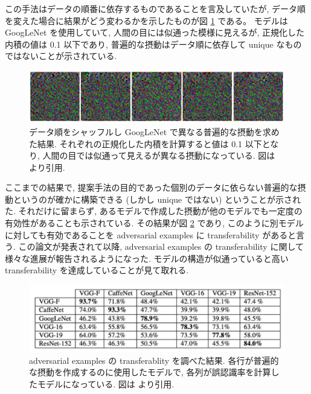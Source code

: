 この手法はデータの順番に依存するものであることを言及していたが, データ順を変えた場合に結果がどう変わるかを示したものが図 \ref{fig:universal-adversarial-perturbations-shuffle} である。
モデルは GoogLeNet を使用していて, 人間の目には似通った模様に見えるが, 正規化した内積の値は 0.1 以下であり, 普遍的な摂動はデータ順に依存して unique なものではないことが示されている.
%
\begin{figure}[htbp]
\begin{center}
\includegraphics[width=14.0cm]{figures/universal-adversarial-perturbations-shuffle.pdf}
\end{center}
\caption{
データ順をシャッフルし GoogLeNet で異なる普遍的な摂動を求めた結果.
それぞれの正規化した内積を計算すると値は 0.1 以下となり, 人間の目では似通って見えるが異なる摂動になっている.
図は \cite{moosavi2017universal} より引用.
}
\label{fig:universal-adversarial-perturbations-shuffle}
\end{figure}
%

ここまでの結果で, 提案手法の目的であった個別のデータに依らない普遍的な摂動というのが確かに構築できる (しかし unique ではない) ということが示された.
それだけに留まらず, あるモデルで作成した摂動が他のモデルでも一定度の有効性があることも示されている.
その結果が図 \ref{fig:universal-adversarial-transferability} であり, このように別モデルに対しても有効であることを adversarial examples に transferability があると言う.
この論文が発表されて以降, adversarial examples の transferability に関して様々な進展が報告されるようになった.
モデルの構造が似通っていると高い transferability を達成していることが見て取れる.
%
\begin{figure}[htbp]
\begin{center}
\includegraphics[width=14.0cm]{figures/universal-adversarial-transferability.pdf}
\end{center}
\caption{
adversarial examples の transferablity を調べた結果.
各行が普遍的な摂動を作成するのに使用したモデルで, 各列が誤認識率を計算したモデルになっている.
図は \cite{moosavi2017universal} より引用.
}
\label{fig:universal-adversarial-transferability}
\end{figure}
%


